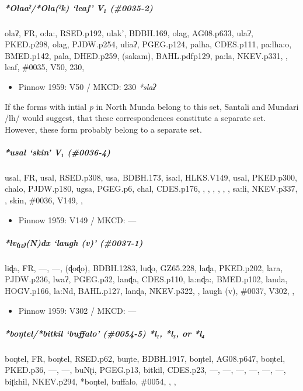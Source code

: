 \documentclass[a4paper,]{article}
\providecommand{\tightlist}{%
  \setlength{\itemsep}{0pt}\setlength{\parskip}{0pt}}
\let\oldsubparagraph\subparagraph
\renewcommand{\subparagraph}[1]{\oldsubparagraph{#1}\mbox{}}
\begin{document}
\subparagraph{\texorpdfstring{\emph{*Olaaˀ}/\emph{*Ola(ˀk)} `leaf' V₁
(\#0035-2)}{*Olaaˀ/*Ola(ˀk) leaf V₁ (\#0035-2)}}\label{olaaux2c0olaux2c0k-leaf-v-0035-2}

olaʔ, FR, o:la:, RSED.p192, ulak', BDBH.169, olag, AG08.p633, ulaʔ,
PKED.p298, olag, PJDW.p254, uliaʔ, PGEG.p124, palha, CDES.p111,
pa:lha:o, BMED.p142, pala, DHED.p259, (sakam), BAHL.pdfp129, pa:la,
NKEV.p331, , leaf, \#0035, V50, 230,

\begin{itemize}
\tightlist
\item
  Pinnow 1959: V50 / MKCD: 230 \emph{*slaʔ}
\end{itemize}

If the forms with intial \emph{p} in North Munda belong to this set,
Santali and Mundari /lh/ would suggest, that these correspondences
constitute a separate set. However, these form probably belong to a
separate set.

\subparagraph{\texorpdfstring{\emph{*usal} `skin' V₁
(\#0036-4)}{*usal skin V₁ (\#0036-4)}}\label{usal-skin-v-0036-4}

usal, FR, usal, RSED.p308, usa, BDBH.173, isa:l, HLKS.V149, usal,
PKED.p300, chalo, PJDW.p180, ugsa, PGEG.p6, chal, CDES.p176, , , , , , ,
sa:li, NKEV.p337, , skin, \#0036, V149, ,

\begin{itemize}
\tightlist
\item
  Pinnow 1959: V149 / MKCD: ---
\end{itemize}

\subparagraph{\texorpdfstring{\emph{*lv₍₁₈₎(N)dx} `laugh (v)'
(\#0037-1)}{*lv₍₁₈₎(N)dx laugh (v) (\#0037-1)}}\label{lvndx-laugh-v-0037-1}

liɖa, FR, ---, ---, (ɖoɖo), BDBH.1283, luɖo, GZ65.228, laɖa, PKED.p202,
lara, PJDW.p236, lwaʔ, PGEG.p32, lanɖa, CDES.p110, la:nɖa:, BMED.p102,
landa, HOGV.p166, la:Nd, BAHL.p127, lanɖa, NKEV.p322, , laugh (v),
\#0037, V302, ,

\begin{itemize}
\tightlist
\item
  Pinnow 1959: V302 / MKCD: ---
\end{itemize}

\subparagraph{\texorpdfstring{\emph{*boŋtel}/\emph{*bitkil} `buffalo'
(\#0054-5) \emph{*l₁}, \emph{*l₃}, or
\emph{*l₄}}{*boŋtel/*bitkil buffalo (\#0054-5) *l₁, *l₃, or *l₄}}\label{boux14btelbitkil-buffalo-0054-5-l-l-or-l}

boŋtel, FR, boŋtel, RSED.p62, buŋte, BDBH.1917, boŋtel, AG08.p647,
boŋtel, PKED.p36, ---, ---, buNʈi, PGEG.p13, bitkil, CDES.p23, ---, ---,
---, ---, ---, ---, biʈkhil, NKEV.p294, *boŋtel, buffalo, \#0054, , ,
\end{document}
